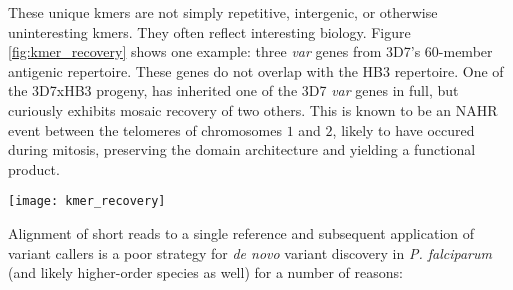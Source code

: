 These unique kmers are not simply repetitive, intergenic, or otherwise uninteresting kmers.  They often reflect interesting biology.  Figure \ref{fig:kmer_recovery} shows one example: three \textit{var} genes from 3D7's $60$-member antigenic repertoire.  These genes do not overlap with the HB3 repertoire.  One of the 3D7xHB3 progeny, has inherited one of the 3D7 \textit{var} genes in full, but curiously exhibits mosaic recovery of two others.  This is known to be an NAHR event between the telomeres of chromosomes $1$ and $2$, likely to have occured during mitosis, preserving the domain architecture and yielding a functional product\cite{Claessens:2014fo}.

\begin{sidewaysfigure}[h!]
  \centering
    \texttt{[image: kmer\_recovery]}
  \caption{Presence and absence of unique kmers in three 3D7 \textit{var} genes.  Each vertical line represents a kmer.  Colored kmers represent those unique 3D7 kmers that are recovered in the sample.  Grey indicates no recovery.  White indicates the kmer at that position was not unique in the 3D7 genome.  Only the coding regions of the respective genes are shown, with domain annotations obtained from the VarDom server\cite{Rask:2010fia}.}
  \label{fig:kmer_recovery}
\end{sidewaysfigure}

Alignment of short reads to a single reference and subsequent application of variant callers is a poor strategy for \textit{de novo} variant discovery in \textit{P. falciparum} (and likely higher-order species as well) for a number of reasons:

